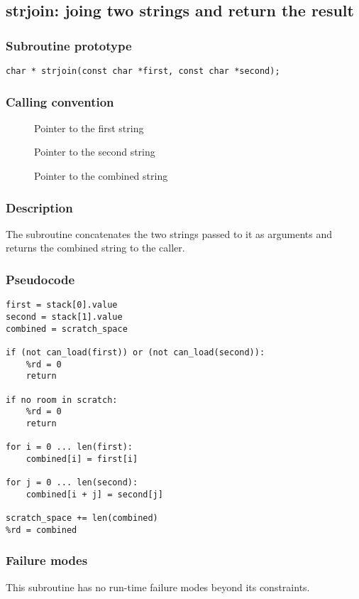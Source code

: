 \clearpage
{}
{}
\label{subr:strjoin}
\subsection*{strjoin: joing two strings and return the result}

\subsubsection*{Subroutine prototype}

\begin{verbatim}
char * strjoin(const char *first, const char *second);
\end{verbatim}

\subsubsection*{Calling convention}

\begin{description}
\item[] Pointer to the first string
\item[] Pointer to the second string
\item[] Pointer to the combined string
\end{description}

\subsubsection*{Description}

The  subroutine concatenates the two strings
passed to it as arguments and returns the combined string to the
caller.

\subsubsection*{Pseudocode}

\begin{verbatim}
first = stack[0].value
second = stack[1].value
combined = scratch_space

if (not can_load(first)) or (not can_load(second)):
    %rd = 0
    return

if no room in scratch:
    %rd = 0
    return

for i = 0 ... len(first):
    combined[i] = first[i]

for j = 0 ... len(second):
    combined[i + j] = second[j]

scratch_space += len(combined)
%rd = combined
\end{verbatim}

\subsubsection*{Failure modes}

This subroutine has no run-time failure modes beyond its constraints.
